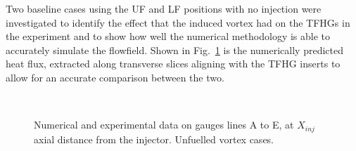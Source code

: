 \documentclass{AIAA}
\begin{document}
Two baseline cases using the UF and LF positions with no injection were investigated to identify the effect that the induced vortex had on the TFHGs in the experiment and to show how well the numerical methodology is able to accurately simulate the flowfield.
Shown in Fig.~\ref{fig:HeatFluxVortex_Lines} is the numerically predicted heat flux, extracted along transverse slices aligning with the TFHG inserts to allow for an accurate comparison between the two.


\begin{figure}[!h]
\center
%
\\
\caption{Numerical and experimental data on gauges lines A to E, at $X_{inj}$ axial distance from the injector. Unfuelled vortex cases.}
\label{fig:HeatFluxVortex_Lines}
\end{figure} 
\end{document}
